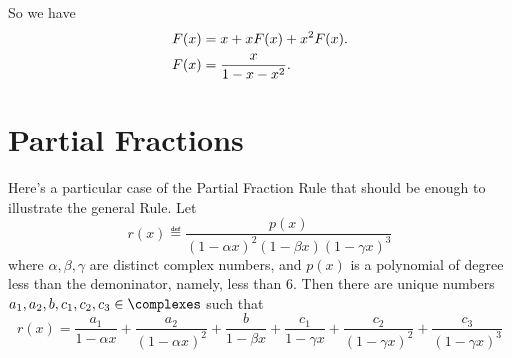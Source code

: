 \documentclass[quiz]{mcs}
\begin{document}
So we have
\begin{align}
F(x) & = x + x F(x) + x^2 F(x). \notag\\
F(x) & = \frac{x}{1 - x - x^2}.\label{Fx}
\end{align}

\section{Partial Fractions}

Here's a particular case of the Partial Fraction Rule that should be
enough to illustrate the general Rule.  Let
\[
r(x) \eqdef \frac{p(x)}{(1-\alpha x)^2 (1-\beta x) (1-\gamma x)^3}
\]
where $\alpha, \beta, \gamma$ are distinct complex numbers, and $p(x)$ is
a polynomial of degree less than the demoninator, namely, less than 6.
Then there are unique numbers $a_1,a_2,b,c_1,c_2,c_3 \in \complexes$ such
that
\[
r(x)
= \frac{a_1}{1-\alpha x} + \frac{a_2}{(1-\alpha x)^2}
+ \frac{b}{1-\beta x}
+ \frac{c_1}{1-\gamma x} + \frac{c_2}{(1-\gamma x)^2} + \frac{c_3}{(1-\gamma x)^3}
\]


\fi
\end{document}
